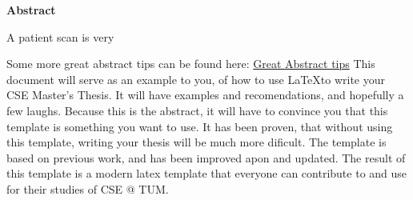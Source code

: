 
\clearemptydoublepage
{}
{}

\vspace*{2cm}
\begin{center}
{\Large \textbf{Abstract}}
\end{center}
\vspace{1cm}

A patient scan is very 

Some more great abstract tips can be found here: 
\href{https://users.ece.cmu.edu/~koopman/essays/abstract.html}{Great Abstract tips}
This document will serve as an example to you, of how to use \LaTeX to write your
CSE Master's Thesis. It will have examples and recomendations, and hopefully a
few laughs.  Because this is the abstract, it will have to convince you that this 
template is something you want to use.  It has been proven, that without using
this template, writing your thesis will be much more dificult. The template is
based on previous work, and has been improved apon and updated.  The result of 
this template is a modern latex template that everyone can contribute to and use
for their studies of CSE @ TUM.